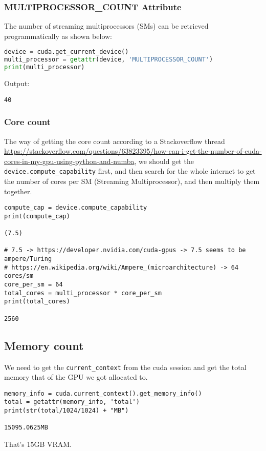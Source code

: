 \documentclass[12pt,a4paper]{cibb}
\begin{document}
\subsubsection{MULTIPROCESSOR\_COUNT Attribute}
The number of streaming multiprocessors (SMs) can be retrieved programmatically as shown below:

\begin{lstlisting}[language=Python]
device = cuda.get_current_device()
multi_processor = getattr(device, 'MULTIPROCESSOR_COUNT')
print(multi_processor)
\end{lstlisting}

Output:
\begin{lstlisting}
40
\end{lstlisting}

\subsubsection{Core count}
The way of getting the core count according to a Stackoverflow thread \url{https://stackoverflow.com/questions/63823395/how-can-i-get-the-number-of-cuda-cores-in-my-gpu-using-python-and-numba}, we should get the \verb|device.compute_capability| first, and then search for the whole internet to get the number of cores per SM (Streaming Multiprocessor), and then multiply them together.
\begin{lstlisting}
compute_cap = device.compute_capability
print(compute_cap)

(7.5)

# 7.5 -> https://developer.nvidia.com/cuda-gpus -> 7.5 seems to be ampere/Turing
# https://en.wikipedia.org/wiki/Ampere_(microarchitecture) -> 64 cores/sm
core_per_sm = 64
total_cores = multi_processor * core_per_sm
print(total_cores)

2560
\end{lstlisting}

\subsection{Memory count}
We need to get the \verb|current_context| from the cuda session and get the total memory that of the GPU we got allocated to.
\begin{lstlisting}
memory_info = cuda.current_context().get_memory_info()
total = getattr(memory_info, 'total')
print(str(total/1024/1024) + "MB")

15095.0625MB

\end{lstlisting}
That's 15GB VRAM.
\normalsize
\end{document}
